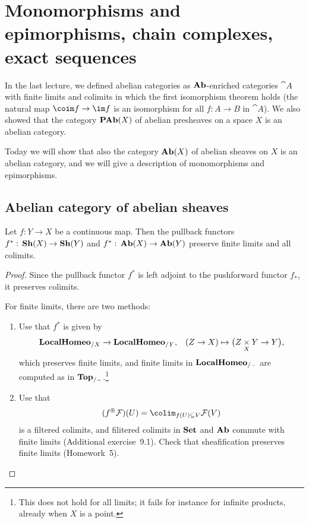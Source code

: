 \chapter{Monomorphisms and epimorphisms, chain complexes, exact sequences}

In the last lecture, we defined abelian categories as \(\mathbf{Ab}\)-enriched categories \(\cat A\) with finite limits and colimits in which the first isomorphism theorem holds (the natural map \(\coim f\to\im f\) is an isomorphism for all \(f\colon A\to B\) in \(\cat A\)).
We also showed that the category \(\operatorname{\mathbf{PAb}}(X)\) of abelian presheaves on a space \(X\) is an abelian category.

Today we will show that also the category \(\operatorname{\mathbf{Ab}}(X)\) of abelian sheaves on \(X\) is an abelian category, and we will give a description of monomorphisms and epimorphisms.

\section{Abelian category of abelian sheaves}

\begin{lem}\label{lem:pullback-preserves-colimits-and-finite-limits}
Let \(f\colon Y\to X\) be a continuous map.
Then the pullback functors \(f^*\colon\catSheaf(X)\to\catSheaf(Y)\) and \(f^*\colon\catAbelianSheaf(X)\to\catAbelianSheaf(Y)\) preserve finite limits and all colimits.
\end{lem}
\begin{proof}
Since the pullback functor \(f^*\) is left adjoint to the pushforward functor \(f_*\), it preserves colimits.

For finite limits, there are two methods:
\begin{enumerate}
\item Use that \(f^*\) is given by
  \[\catLocalHomeomorphism_{/X}\to\catLocalHomeomorphism_{/Y}\text{,} \quad (Z\to X) \mapsto \bigl(Z\pullback{X}Y\to Y\bigr)\text{,} \]
  which preserves finite limits, and finite limits in \(\mathbf{LocalHomeo}_{/-}\) are computed as in \(\mathbf{Top}_{/-}\).\footnote{This does not hold for all limits; it fails for instance for infinite products, already when \(X\) is a point.}
\item Use that
  \[(f^\circledast\mathcal F)(U) = \colim_{f(U)\subseteq V}\mathcal F(V) \]
  is a filtered colimits, and filitered colimits in \(\mathbf{Set}\) and \(\mathbf{Ab}\) commute with finite limits (Additional exercise~9.1).
  Check that sheafification preserves finite limits (Homework~5).
  \qedhere
\end{enumerate}
\end{proof}


